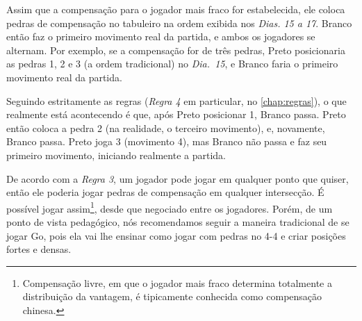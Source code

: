 Assim que a compensação para o jogador mais fraco for estabelecida, ele coloca pedras de compensação no tabuleiro na ordem exibida nos \emph{Dias. 15 a 17}. Branco então faz o primeiro movimento real da partida, e ambos os jogadores se alternam. Por exemplo, se a compensação for de três pedras, Preto posicionaria as pedras 1, 2 e 3 (a ordem tradicional) no \emph{Dia.\@~15}, e Branco faria o primeiro movimento real da partida.

Seguindo estritamente as regras (\emph{Regra 4} em particular, no \autoref{chap:regras}), o que realmente está acontecendo é que, após Preto posicionar 1, Branco passa. Preto então coloca a pedra 2 (na realidade, o terceiro movimento), e, novamente, Branco passa. Preto joga 3 (movimento 4), mas Branco não passa e faz seu primeiro movimento, iniciando realmente a partida.

De acordo com a \emph{Regra 3}, um jogador pode jogar em qualquer ponto que quiser, então ele poderia jogar pedras de compensação em qualquer intersecção. É possível jogar assim\footnote{Compensação livre, em que o jogador mais fraco determina totalmente a distribuição da vantagem, é tipicamente conhecida como compensação chinesa.}, desde que negociado entre os jogadores. Porém, de um ponto de vista pedagógico, nós recomendamos seguir a maneira tradicional de se jogar Go, pois ela vai lhe ensinar como jogar com pedras no 4-4 e criar posições fortes e densas.